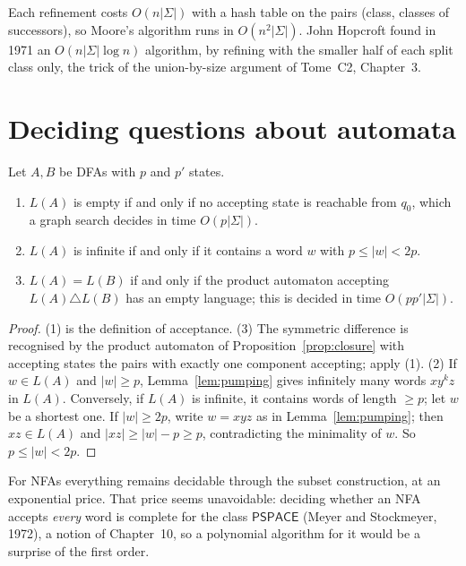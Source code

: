 Each refinement costs $O(n|\Sigma|)$ with a hash table on the pairs (class, classes of successors), so Moore's algorithm runs in $O(n^2|\Sigma|)$. John Hopcroft found in 1971 an $O(n|\Sigma|\log n)$ algorithm, by refining with the smaller half of each split class only, the trick of the union-by-size argument of Tome~C2, Chapter~3.

\section{Deciding questions about automata}\label{sec:decide}

\begin{proposition}\label{prop:decide}
Let $A,B$ be DFAs with $p$ and $p'$ states.
\begin{enumerate}
\item $L(A)$ is empty if and only if no accepting state is reachable from $q_0$, which a graph search decides in time $O(p|\Sigma|)$.
\item $L(A)$ is infinite if and only if it contains a word $w$ with $p\le|w|<2p$.
\item $L(A)=L(B)$ if and only if the product automaton accepting $L(A)\triangle L(B)$ has an empty language; this is decided in time $O(pp'|\Sigma|)$.
\end{enumerate}
\end{proposition}

\begin{proof}
(1) is the definition of acceptance. (3) The symmetric difference is recognised by the product automaton of Proposition~\ref{prop:closure} with accepting states the pairs with exactly one component accepting; apply (1). (2) If $w\in L(A)$ and $|w|\ge p$, Lemma~\ref{lem:pumping} gives infinitely many words $xy^kz$ in $L(A)$. Conversely, if $L(A)$ is infinite, it contains words of length $\ge p$; let $w$ be a shortest one. If $|w|\ge2p$, write $w=xyz$ as in Lemma~\ref{lem:pumping}; then $xz\in L(A)$ and $|xz|\ge|w|-p\ge p$, contradicting the minimality of $w$. So $p\le|w|<2p$.
\end{proof}

For NFAs everything remains decidable through the subset construction, at an exponential price. That price seems unavoidable: deciding whether an NFA accepts \emph{every} word is complete for the class $\mathsf{PSPACE}$ (Meyer and Stockmeyer, 1972), a notion of Chapter~10, so a polynomial algorithm for it would be a surprise of the first order.

